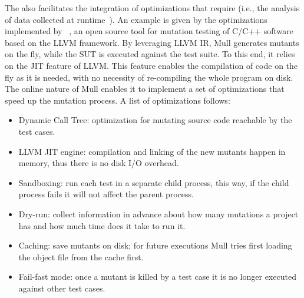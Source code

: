 



The  also facilitates the integration of optimizations that require  (i.e., the analysis of data collected at runtime~\cite{Pezze:Book}). An example is given by the optimizations implemented by ~\cite{denisov2018mull}, an open source tool for mutation testing of C/C++ software based on the LLVM framework. By leveraging LLVM IR, Mull generates mutants on the fly, while the SUT is executed against the test suite. To this end, it relies on the JIT feature of LLVM. This feature enables the compilation of code on the fly as it is needed, with no necessity of re-compiling the whole program on disk. The online nature of Mull enables it to implement a set of optimizations that speed up the mutation process. A list of optimizations follows:
\begin{itemize}
	\item Dynamic Call Tree: optimization for mutating source code reachable by the test cases.
	\item LLVM JIT engine: compilation and linking of the new mutants happen in memory, thus there is no disk I/O overhead.
	\item Sandboxing: run each test in a separate child process, this way, if the child process fails it will not affect the parent process.
	\item Dry-run: collect information in advance about how many mutations a project has and how much time does it take to run it.
	\item Caching: save mutants on disk; for future executions Mull tries first loading the object file from the cache first.
	\item Fail-fast mode: once a mutant is killed by a test case it is no longer executed against other test cases.
\end{itemize}

